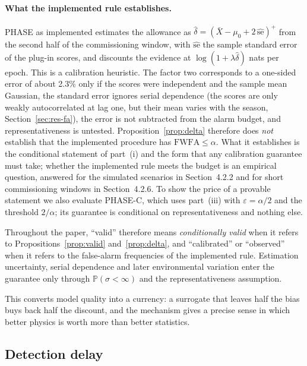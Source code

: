 \documentclass[12pt,a4paper]{article}
\newenvironment{revblock}{}{}
\newenvironment{revblock}{\begingroup\color{revcol}}{\endgroup}
\newcommand{\Prob}{\mathbb{P}}
\begin{document}
\begin{revblock}
\paragraph{What the implemented rule establishes.} PHASE as implemented estimates the allowance as $\hat\delta=(\bar X-\mu_0+2\,\widehat{\mathrm{se}})^{+}$ from the second half of the commissioning window, with $\widehat{\mathrm{se}}$ the sample standard error of the plug-in scores, and discounts the evidence at $\log(1+\lambda\hat\delta)$ nats per epoch. This is a calibration heuristic. The factor two corresponds to a one-sided error of about 2.3\% only if the scores were independent and the sample mean Gaussian, the standard error ignores serial dependence (the scores are only weakly autocorrelated at lag one, but their mean varies with the season, Section~\ref{sec:res-fa}), the error is not subtracted from the alarm budget, and representativeness is untested. Proposition~\ref{prop:delta} therefore does \emph{not} establish that the implemented procedure has $\mathrm{FWFA}\le\alpha$. What it establishes is the conditional statement of part~(i) and the form that any calibration guarantee must take; whether the implemented rule meets the budget is an empirical question, answered for the simulated scenarios in Section~4.2.2 and for short commissioning windows in Section~4.2.6. To show the price of a provable statement we also evaluate PHASE-C, which uses part~(iii) with $\varepsilon=\alpha/2$ and the threshold $2/\alpha$; its guarantee is conditional on representativeness and nothing else.

Throughout the paper, ``valid'' therefore means \emph{conditionally valid} when it refers to Propositions~\ref{prop:valid} and~\ref{prop:delta}, and ``calibrated'' or ``observed'' when it refers to the false-alarm frequencies of the implemented rule. Estimation uncertainty, serial dependence and later environmental variation enter the guarantee only through $\Prob(\sigma<\infty)$ and the representativeness assumption.
\end{revblock}

This converts model quality into a currency: a surrogate that leaves half the bias buys back half the discount, and the mechanism gives a precise sense in which better physics is worth more than better statistics.

\subsection{Detection delay}\label{sec:delaybound}
\end{document}
